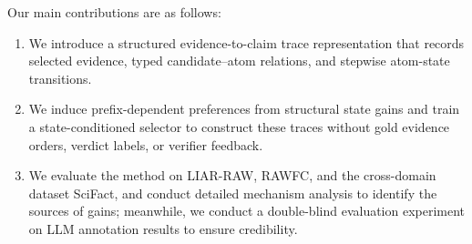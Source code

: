 \documentclass[letterpaper]{article}
\begin{document}
Our main contributions are as follows:




\begin{enumerate}
\item We introduce a structured evidence-to-claim trace representation that records selected evidence, typed candidate–atom relations, and stepwise atom-state transitions.

\item We induce prefix-dependent preferences from structural state gains and train a state-conditioned selector to construct these traces without gold evidence orders, verdict labels, or verifier feedback.

\item We evaluate the method on LIAR-RAW, RAWFC, and the cross-domain dataset SciFact, and conduct detailed mechanism analysis to identify the sources of gains; meanwhile, we conduct a double-blind evaluation experiment on LLM annotation results to ensure credibility.
\end{enumerate}
\end{document}
